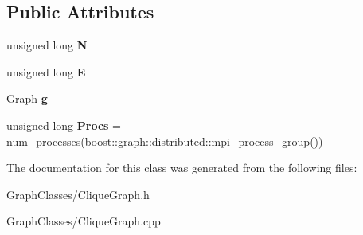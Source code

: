 \subsection*{Public Attributes}
\begin{DoxyCompactItemize}
\item 
\mbox{\label{classCliqueGraphObject_a1939c1fc1a272993642483907549bd71}} 
unsigned long {\bfseries N}
\item 
\mbox{\label{classCliqueGraphObject_a4faceb0a6fecb58101d0ab8f7387b465}} 
unsigned long {\bfseries E}
\item 
\mbox{\label{classCliqueGraphObject_ab1ea07882335176bcc4294ef47d312c7}} 
Graph {\bfseries g}
\item 
\mbox{\label{classCliqueGraphObject_ae67ffb085c1b077a7d9a8577ccfbf4b2}} 
unsigned long {\bfseries Procs} = num\+\_\+processes(boost\+::graph\+::distributed\+::mpi\+\_\+process\+\_\+group())
\end{DoxyCompactItemize}


The documentation for this class was generated from the following files\+:\begin{DoxyCompactItemize}
\item 
Graph\+Classes/Clique\+Graph.\+h\item 
Graph\+Classes/Clique\+Graph.\+cpp\end{DoxyCompactItemize}
